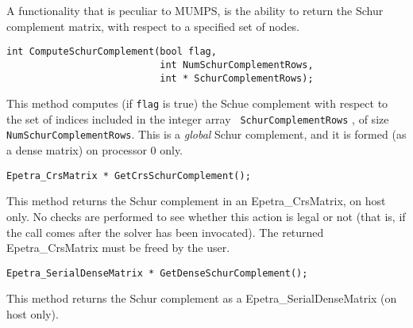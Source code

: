 \documentclass[11pt]{SANDreport}
\begin{document}
\bigskip
  
A functionality that is peculiar to MUMPS, is the ability to return
the Schur complement matrix, with respect to a specified set of nodes.

\begin{verbatim}
int ComputeSchurComplement(bool flag,
                           int NumSchurComplementRows, 
                           int * SchurComplementRows);
\end{verbatim}
This method computes (if \verb!flag! is true) the Schue complement with
respect to the set of indices included in the integer array {\tt
  SchurComplementRows} , of size {\tt NumSchurComplementRows}. This is a
{\sl global} Schur complement, and it is formed (as a dense matrix) on
processor 0 only.

\medskip

\begin{verbatim}
Epetra_CrsMatrix * GetCrsSchurComplement();
\end{verbatim}
This method returns the Schur complement in an Epetra\_CrsMatrix, on host
only. No checks are performed to see whether this action is legal or not
(that is, if the call comes after the solver has been invocated).
The returned Epetra\_CrsMatrix must be freed by the user.

\medskip

\begin{verbatim}
Epetra_SerialDenseMatrix * GetDenseSchurComplement();
\end{verbatim}
This method returns the Schur complement as a Epetra\_SerialDenseMatrix
(on host only).

\medskip
\end{document}
